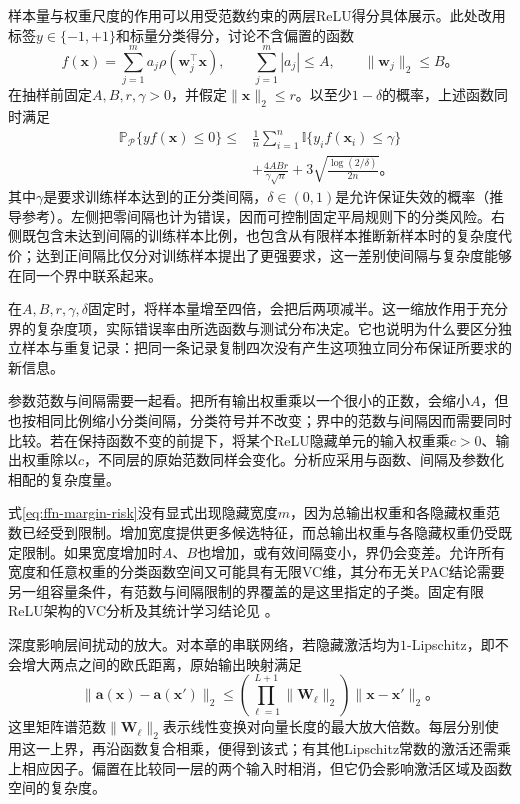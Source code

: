 样本量与权重尺度的作用可以用受范数约束的两层ReLU得分具体展示。此处改用标签$y\in\{-1,+1\}$和标量分类得分，讨论不含偏置的函数
\[
  f(\bm{x})=\sum_{j=1}^{m}a_j\rho(\bm{w}_j^{\top}\bm{x}),
  \qquad \sum_{j=1}^{m}|a_j|\leq A,
  \qquad \lVert\bm{w}_j\rVert_2\leq B\text{。}
\]
在抽样前固定$A,B,r,\gamma>0$，并假定$\lVert\bm{x}\rVert_2\leq r$。以至少$1-\delta$的概率，上述函数同时满足
\begin{equation}
  \begin{aligned}
    \mathbb{P}_{\mathcal{P}}\{yf(\bm{x})\leq0\}
    \leq{}&\frac1n\sum_{i=1}^{n}
      \mathbb{I}\{y_i f(\bm{x}_i)\leq\gamma\}\\
    &+\frac{4ABr}{\gamma\sqrt n}
      +3\sqrt{\frac{\log(2/\delta)}{2n}}\text{。}
  \end{aligned}
  \label{eq:ffn-margin-risk}
\end{equation}
其中$\gamma$是要求训练样本达到的正分类间隔，$\delta\in(0,1)$是允许保证失效的概率（推导参考）。左侧把零间隔也计为错误，因而可控制固定平局规则下的分类风险。右侧既包含未达到间隔的训练样本比例，也包含从有限样本推断新样本时的复杂度代价；达到正间隔比仅分对训练样本提出了更强要求，这一差别使间隔与复杂度能够在同一个界中联系起来。

在$A,B,r,\gamma,\delta$固定时，将样本量增至四倍，会把后两项减半。这一缩放作用于充分界的复杂度项，实际错误率由所选函数与测试分布决定。它也说明为什么要区分独立样本与重复记录：把同一条记录复制四次没有产生这项独立同分布保证所要求的新信息。

参数范数与间隔需要一起看。把所有输出权重乘以一个很小的正数，会缩小$A$，但也按相同比例缩小分类间隔，分类符号并不改变；界中的范数与间隔因而需要同时比较。若在保持函数不变的前提下，将某个ReLU隐藏单元的输入权重乘$c>0$、输出权重除以$c$，不同层的原始范数同样会变化。分析应采用与函数、间隔及参数化相配的复杂度量。

式\eqref{eq:ffn-margin-risk}没有显式出现隐藏宽度$m$，因为总输出权重和各隐藏权重范数已经受到限制。增加宽度提供更多候选特征，而总输出权重与各隐藏权重仍受既定限制。如果宽度增加时$A$、$B$也增加，或有效间隔变小，界仍会变差。允许所有宽度和任意权重的分类函数空间又可能具有无限VC维，其分布无关PAC结论需要另一组容量条件，有范数与间隔限制的界覆盖的是这里指定的子类。固定有限ReLU架构的VC分析及其统计学习结论见
。

深度影响层间扰动的放大。对本章的串联网络，若隐藏激活均为$1$-Lipschitz，即不会增大两点之间的欧氏距离，原始输出映射满足
\begin{equation}
  \lVert\bm{a}(\bm{x})-\bm{a}(\bm{x}')\rVert_2
  \leq
  \left(\prod_{\ell=1}^{L+1}\lVert\bm{W}_\ell\rVert_2\right)
  \lVert\bm{x}-\bm{x}'\rVert_2\text{。}
  \label{eq:ffn-input-sensitivity}
\end{equation}
这里矩阵谱范数$\lVert\bm{W}_\ell\rVert_2$表示线性变换对向量长度的最大放大倍数。每层分别使用这一上界，再沿函数复合相乘，便得到该式；有其他Lipschitz常数的激活还需乘上相应因子。偏置在比较同一层的两个输入时相消，但它仍会影响激活区域及函数空间的复杂度。

